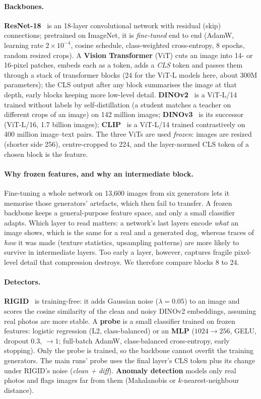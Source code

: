\documentclass[10pt,a4paper]{article}
\begin{document}
\paragraph{Backbones.}
\textbf{ResNet-18}~\cite{he2016resnet} is an 18-layer convolutional network with residual (skip) connections; pretrained on ImageNet, it is \emph{fine-tuned} end to end (AdamW, learning rate $2\times10^{-4}$, cosine schedule, class-weighted cross-entropy, 8 epochs, random resized crops). A \textbf{Vision Transformer} (ViT) cuts an image into 14- or 16-pixel patches, embeds each as a token, adds a \emph{CLS} token and passes them through a stack of transformer blocks (24 for the ViT-L models here, about 300M parameters); the CLS output after any block summarises the image at that depth, early blocks keeping more low-level detail. \textbf{DINOv2}~\cite{oquab2024dinov2} is a ViT-L/14 trained without labels by self-distillation (a student matches a teacher on different crops of an image) on 142 million images; \textbf{DINOv3}~\cite{simeoni2025dinov3} is its successor (ViT-L/16, 1.7 billion images); \textbf{CLIP}~\cite{radford2021clip} is a ViT-L/14 trained contrastively on 400 million image--text pairs. The three ViTs are used \emph{frozen}: images are resized (shorter side 256), centre-cropped to 224, and the layer-normed CLS token of a chosen block is the feature.

\paragraph{Why frozen features, and why an intermediate block.}
Fine-tuning a whole network on 13,600 images from six generators lets it memorise those generators' artefacts, which then fail to transfer. A frozen backbone keeps a general-purpose feature space, and only a small classifier adapts. Which layer to read matters: a network's last layers encode \emph{what} an image shows, which is the same for a real and a generated dog, whereas traces of \emph{how} it was made (texture statistics, upsampling patterns) are more likely to survive in intermediate layers. Too early a layer, however, captures fragile pixel-level detail that compression destroys. We therefore compare blocks 8 to 24.

\paragraph{Detectors.}
\textbf{RIGID}~\cite{he2024rigid} is training-free: it adds Gaussian noise ($\lambda = 0.05$) to an image and scores the cosine similarity of the clean and noisy DINOv2 embeddings, assuming real photos are more stable. A \textbf{probe} is a small classifier trained on frozen features: logistic regression (L2, class-balanced) or an \textbf{MLP} ($1024 \to 256$, GELU, dropout 0.3, $\to 1$; full-batch AdamW, class-balanced cross-entropy, early stopping). Only the probe is trained, so the backbone cannot overfit the training generators. The main runs' probe uses the final layer's CLS token plus its change under RIGID's noise (\emph{clean + diff}). \textbf{Anomaly detection} models only real photos and flags images far from them (Mahalanobis or $k$-nearest-neighbour distance).
\end{document}
